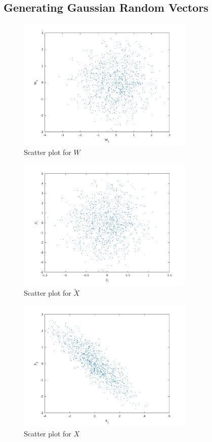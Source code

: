 \documentclass{article}
\begin{document}
	\subsection{Generating Gaussian Random Vectors}
	\begin{figure}[h]
		\begin{center}
		\includegraphics[width=0.75\textwidth]{rvW.png}
		\caption{Scatter plot for $W$}
		\end{center}
	\end{figure}
	\begin{figure}[h]
		\begin{center}
		\includegraphics[width=0.75\textwidth]{rvXtilda.png}
		\caption{Scatter plot for $\tilde{X}$}
		\end{center}
	\end{figure}
	\begin{figure}[h]
		\begin{center}
		\includegraphics[width=0.75\textwidth]{rvX.png}
		\caption{Scatter plot for $X$}
		\end{center}
	\end{figure}
\end{document}
